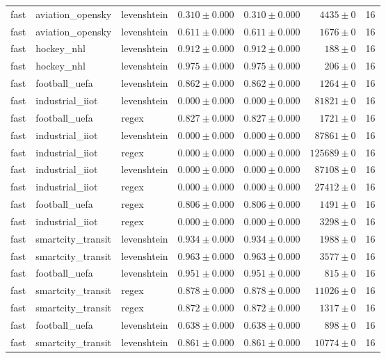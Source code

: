 \begin{table}[htbp]
\begin{tabular}{l l l r r r r}
fast & aviation\_opensky & levenshtein & $0.310\pm0.000$ & $0.310\pm0.000$ & $4435\pm0$ & 16 \\
fast & aviation\_opensky & levenshtein & $0.611\pm0.000$ & $0.611\pm0.000$ & $1676\pm0$ & 16 \\
fast & hockey\_nhl & levenshtein & $0.912\pm0.000$ & $0.912\pm0.000$ & $188\pm0$ & 16 \\
fast & hockey\_nhl & levenshtein & $0.975\pm0.000$ & $0.975\pm0.000$ & $206\pm0$ & 16 \\
fast & football\_uefa & levenshtein & $0.862\pm0.000$ & $0.862\pm0.000$ & $1264\pm0$ & 16 \\
fast & industrial\_iiot & levenshtein & $0.000\pm0.000$ & $0.000\pm0.000$ & $81821\pm0$ & 16 \\
fast & football\_uefa & regex & $0.827\pm0.000$ & $0.827\pm0.000$ & $1721\pm0$ & 16 \\
fast & industrial\_iiot & levenshtein & $0.000\pm0.000$ & $0.000\pm0.000$ & $87861\pm0$ & 16 \\
fast & industrial\_iiot & regex & $0.000\pm0.000$ & $0.000\pm0.000$ & $125689\pm0$ & 16 \\
fast & industrial\_iiot & levenshtein & $0.000\pm0.000$ & $0.000\pm0.000$ & $87108\pm0$ & 16 \\
fast & industrial\_iiot & regex & $0.000\pm0.000$ & $0.000\pm0.000$ & $27412\pm0$ & 16 \\
fast & football\_uefa & regex & $0.806\pm0.000$ & $0.806\pm0.000$ & $1491\pm0$ & 16 \\
fast & industrial\_iiot & regex & $0.000\pm0.000$ & $0.000\pm0.000$ & $3298\pm0$ & 16 \\
fast & smartcity\_transit & levenshtein & $0.934\pm0.000$ & $0.934\pm0.000$ & $1988\pm0$ & 16 \\
fast & smartcity\_transit & levenshtein & $0.963\pm0.000$ & $0.963\pm0.000$ & $3577\pm0$ & 16 \\
fast & football\_uefa & levenshtein & $0.951\pm0.000$ & $0.951\pm0.000$ & $815\pm0$ & 16 \\
fast & smartcity\_transit & regex & $0.878\pm0.000$ & $0.878\pm0.000$ & $11026\pm0$ & 16 \\
fast & smartcity\_transit & regex & $0.872\pm0.000$ & $0.872\pm0.000$ & $1317\pm0$ & 16 \\
fast & football\_uefa & levenshtein & $0.638\pm0.000$ & $0.638\pm0.000$ & $898\pm0$ & 16 \\
fast & smartcity\_transit & levenshtein & $0.861\pm0.000$ & $0.861\pm0.000$ & $10774\pm0$ & 16 \\

\end{tabular}
\end{table}
